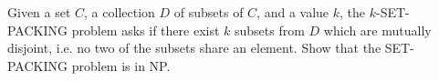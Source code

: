 \problem{}
Given a set $C$, a collection $D$ of subsets of $C$, and a value $k$, the $k$-SET-PACKING problem asks if there exist $k$ subsets from $D$ which are mutually disjoint, i.e. no two of the subsets share an element.  Show that the SET-PACKING problem is in NP.

\solution{}









\newpage
